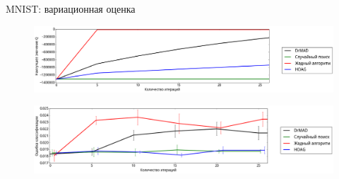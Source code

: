 \documentclass[11pt,pdf,utf8,russian,aspectratio=169]{beamer}
\begin{document}
\begin{frame}{MNIST: вариационная оценка}
\begin{figure}[h]
\includegraphics[width=\textwidth]{./slide_plots/mnist_q_var.png}
\end{figure}
\begin{figure}[h]
\includegraphics[width=\textwidth]{./slide_plots/mnist_e_var.png}
\end{figure}
\end{frame}
\end{document}
